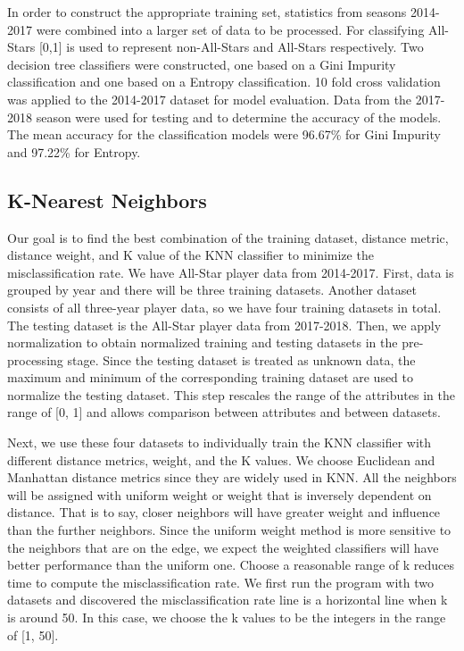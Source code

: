 \documentclass{article}
\begin{document}
In order to construct the appropriate training set, statistics from seasons 2014-2017 were combined into a larger set of data to be processed. For classifying All-Stars [0,1] is used to represent non-All-Stars and All-Stars respectively. Two decision tree classifiers were constructed, one based on a Gini Impurity classification and one based on a Entropy classification. 10 fold cross validation was applied to the 2014-2017 dataset for model evaluation. Data from the 2017-2018 season were used for testing and to determine the accuracy of the models. The mean accuracy for the classification models were 96.67\% for Gini Impurity and 97.22\% for Entropy.


\subsection{K-Nearest Neighbors}
Our goal is to find the best combination of the training dataset, distance metric, distance weight, and K value of the KNN classifier to minimize the misclassification rate. We have All-Star player data from 2014-2017. First, data is grouped by year and there will be three training datasets. Another dataset consists of all three-year player data, so we have four training datasets in total. The testing dataset is the All-Star player data from 2017-2018. Then, we apply normalization to obtain normalized training and testing datasets in the pre-processing stage. Since the testing dataset is treated as unknown data, the maximum and minimum of the corresponding training dataset are used to normalize the testing dataset. This step rescales the range of the attributes in the range of [0, 1] and allows comparison between attributes and between datasets. 

Next, we use these four datasets to individually train the KNN classifier with different distance metrics, weight, and the K values. We choose Euclidean and Manhattan distance metrics since they are widely used in KNN. All the neighbors will be assigned with uniform weight or weight that is inversely dependent on distance. That is to say, closer neighbors will have greater weight and influence than the further neighbors. Since the uniform weight method is more sensitive to the neighbors that are on the edge, we expect the weighted classifiers will have better performance than the uniform one. Choose a reasonable range of k reduces time to compute the misclassification rate. We first run the program with two datasets and discovered the misclassification rate line is a horizontal line when k is around 50. In this case, we choose the k values to be the integers in the range of [1, 50]. 
\end{document}

